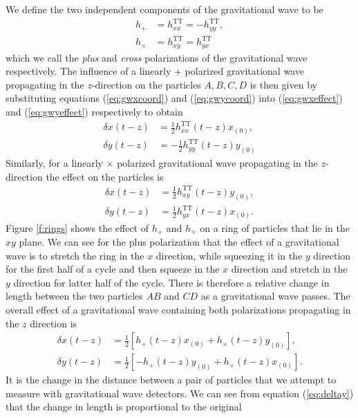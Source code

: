 We define the two independent components of the gravitational wave to be
\begin{align}
h_{+} &= h_{xx}^\mathrm{TT} = - h_{yy}^\mathrm{TT}, \\
h_{\times} &= h_{xy}^\mathrm{TT} = h_{yx}^\mathrm{TT}
\end{align}
which we call the \emph{plus} and \emph{cross} polarizations of the
gravitational wave respectively.  The influence of a linearly $+$ polarized
gravitational wave propagating in the $z$-direction on the particles $A,B,C,D$
is then given by substituting equations (\ref{eq:gwxcoord}) and
(\ref{eq:gwycoord}) into (\ref{eq:gwxeffect}) and (\ref{eq:gwyeffect})
respectively to obtain
\begin{align}
\delta x(t-z) &= \frac{1}{2} h_{xx}^\mathrm{TT}(t-z) x_{(0)},\\
\delta y(t-z) &= -\frac{1}{2} h_{yy}^\mathrm{TT}(t-z) y_{(0)}
\end{align}
Similarly, for a linearly $\times$ polarized gravitational wave propagating in the
$z$-direction the effect on the particles is
\begin{align}
\delta x(t-z) &= \frac{1}{2} h_{xy}^\mathrm{TT}(t-z) y_{(0)},\\
\delta y(t-z) &= \frac{1}{2} h_{yx}^\mathrm{TT}(t-z) x_{(0)}.
\end{align}
Figure \ref{f:rings} shows the effect of $h_{+}$ and $h_{\times}$ on a ring
of particles that lie in the $xy$ plane. We can see for the plus polarization
that the effect of a gravitational wave is to stretch the ring
in the $x$ direction, while squeezing it in the $y$ direction for the first
half of a cycle and then squeeze in the $x$ direction and stretch in the $y$
direction for latter half of the cycle.  There is therefore a relative change
in length between the two particles $AB$ and $CD$ as a gravitational wave
passes.  The overall effect of a gravitational wave containing both polarizations
propagating in the $z$ direction is
\begin{align}
\label{eq:deltax}
\delta x(t-z) &= \frac{1}{2}\left[h_{+}(t-z) x_{(0)} + h_{\times}(t-z) y_{(0)}\right],\\
\delta y(t-z) &= \frac{1}{2}\left[-h_{+}(t-z) y_{(0)} + h_{\times}(t-z) x_{(0)}\right].
\label{eq:deltay}
\end{align}
It is the change in the distance between a pair of particles that we attempt
to measure with gravitational wave detectors. We can see from equation
(\ref{eq:deltay}) that the change in length is proportional to the original
